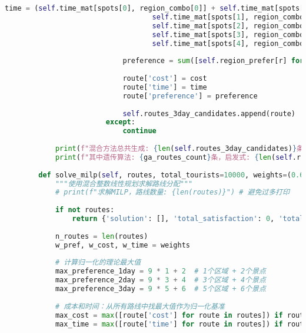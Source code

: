\begin{lstlisting}[language=Python]
                            time = (self.time_mat[spots[0], region_combo[0]] + self.time_mat[spots[1], region_combo[0]] +
                                   self.time_mat[spots[1], region_combo[1]] + self.time_mat[spots[2], region_combo[1]] +
                                   self.time_mat[spots[2], region_combo[2]] + self.time_mat[spots[3], region_combo[2]] +
                                   self.time_mat[spots[3], region_combo[3]] + self.time_mat[spots[4], region_combo[3]] +
                                   self.time_mat[spots[4], region_combo[4]] + self.time_mat[spots[5], region_combo[4]])
                            
                            preference = sum([self.region_prefer[r] for r in region_combo]) + 6
                            
                            route['cost'] = cost
                            route['time'] = time
                            route['preference'] = preference
                            
                            self.routes_3day_candidates.append(route)
                        except:
                            continue
            
            print(f"混合方法总共生成: {len(self.routes_3day_candidates)}条路线")
            print(f"其中遗传算法: {ga_routes_count}条，启发式: {len(self.routes_3day_candidates) - ga_routes_count}条")
        
        def solve_milp(self, routes, total_tourists=10000, weights=(0.6, 0.2, 0.2)):
            """使用混合整数线性规划求解路线分配"""
            # print(f"求解MILP，路线数量: {len(routes)}") # 避免过多打印
            
            if not routes:
                return {'solution': [], 'total_satisfaction': 0, 'total_tourists': 0} # 返回包含总满意度和总游客数的字典
            
            n_routes = len(routes)
            w_pref, w_cost, w_time = weights
            
            # 计算归一化的理论最大值
            max_preference_1day = 9 * 1 + 2  # 1个区域 + 2个景点
            max_preference_2day = 9 * 3 + 4  # 3个区域 + 4个景点  
            max_preference_3day = 9 * 5 + 6  # 5个区域 + 6个景点
            
            # 成本和时间：从所有路线中找最大值作为归一化基准
            max_cost = max([route['cost'] for route in routes]) if routes else 1
            max_time = max([route['time'] for route in routes]) if routes else 1
            

\end{lstlisting}
